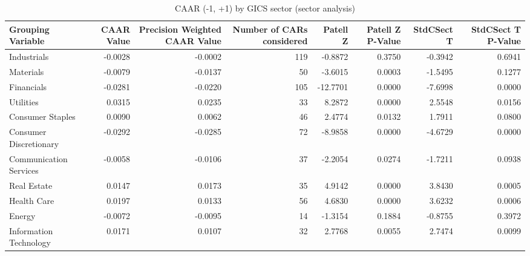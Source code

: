 \begin{table}
\caption{CAAR (-1, +1) by GICS sector (sector analysis)}
\label{tab:sector_caar}
\begin{tabular}{lrrrrrrr}
\toprule
Grouping Variable & CAAR Value & Precision Weighted CAAR Value & Number of CARs considered & Patell Z & Patell Z P-Value & StdCSect T & StdCSect T P-Value \\
\midrule
Industrials & -0.0028 & -0.0002 & 119 & -0.8872 & 0.3750 & -0.3942 & 0.6941 \\
Materials & -0.0079 & -0.0137 & 50 & -3.6015 & 0.0003 & -1.5495 & 0.1277 \\
Financials & -0.0281 & -0.0220 & 105 & -12.7701 & 0.0000 & -7.6998 & 0.0000 \\
Utilities & 0.0315 & 0.0235 & 33 & 8.2872 & 0.0000 & 2.5548 & 0.0156 \\
Consumer Staples & 0.0090 & 0.0062 & 46 & 2.4774 & 0.0132 & 1.7911 & 0.0800 \\
Consumer Discretionary & -0.0292 & -0.0285 & 72 & -8.9858 & 0.0000 & -4.6729 & 0.0000 \\
Communication Services & -0.0058 & -0.0106 & 37 & -2.2054 & 0.0274 & -1.7211 & 0.0938 \\
Real Estate & 0.0147 & 0.0173 & 35 & 4.9142 & 0.0000 & 3.8430 & 0.0005 \\
Health Care & 0.0197 & 0.0133 & 56 & 4.6830 & 0.0000 & 3.6232 & 0.0006 \\
Energy & -0.0072 & -0.0095 & 14 & -1.3154 & 0.1884 & -0.8755 & 0.3972 \\
Information Technology & 0.0171 & 0.0107 & 32 & 2.7768 & 0.0055 & 2.7474 & 0.0099 \\
\bottomrule
\end{tabular}
\end{table}
